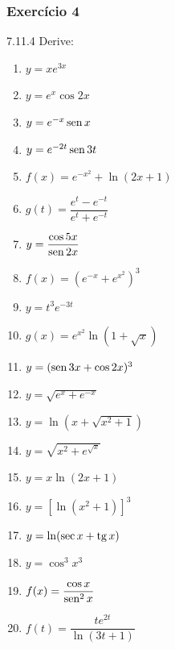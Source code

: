 \subsubsection*{Exercício 4}
\begin{exercicio}[4]{7.11.4}
Derive:
\begin{enumerate}[label=\alph*)]
    \item $y = xe^{3x}$
    \item $y = e^x \cos 2x$
    \item $y = e^{-x}\operatorname{sen} x$
    \item $y = e^{-2t}\operatorname{sen} 3t$
    \item $f(x) = e^{-x^2} + \ln(2x + 1)$
    \item $g(t) = \dfrac{e^t - e^{-t}}{e^t + e^{-t}}$
    \item $y = \dfrac{\cos 5x}{\operatorname{sen} 2x}$
    \item $f(x) = (e^{-x} + e^{x^2})^3$
    \item $y = t^3 e^{-3t}$
    \item $g(x) = e^{x^2}\ln(1 + \sqrt{x})$
    \item $y = (\operatorname{sen} 3x + \cos 2x)^3$
    \item $y = \sqrt{e^x + e^{-x}}$
    \item $y = \ln(x + \sqrt{x^2 + 1})$
    \item $y = \sqrt{x^2 + e^{\sqrt{x}}}$
    \item $y = x\ln(2x + 1)$
    \item $y = [\ln(x^2 + 1)]^3$
    \item $y = \ln(\sec x + \operatorname{tg} x)$
    \item $y = \cos^3 x^3$
    \item $f(x) = \dfrac{\cos x}{\operatorname{sen}^2 x}$
    \item $f(t) = \dfrac{te^{2t}}{\ln(3t + 1)}$
\end{enumerate}
\end{exercicio}

